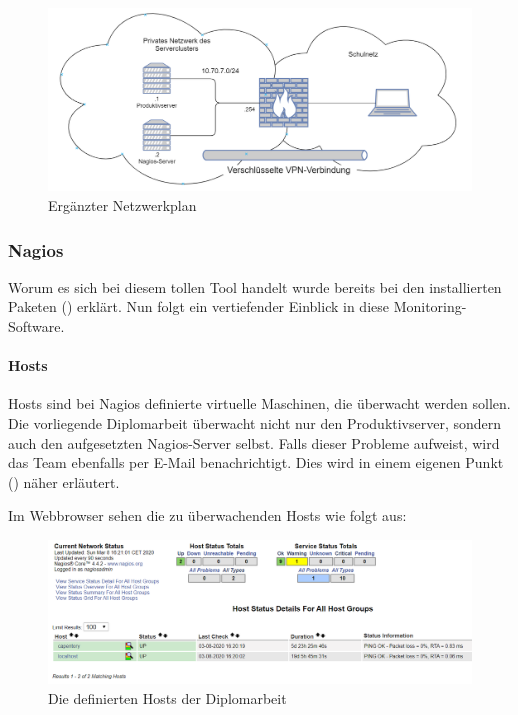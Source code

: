 \documentclass[
]{article}
\begin{document}
\begin{figure}[ht]
\centering
\includegraphics{neutopo.png}
\caption{Ergänzter Netzwerkplan}
\end{figure}

\hypertarget{nagios-1}{%
\subsubsection{Nagios}\label{nagios-1}}

Worum es sich bei diesem tollen Tool handelt wurde bereits bei den
installierten Paketen () erklärt. Nun folgt ein
vertiefender Einblick in diese Monitoring-Software.

\hypertarget{hosts}{%
\paragraph{Hosts}\label{hosts}}

Hosts sind bei Nagios definierte virtuelle Maschinen, die überwacht
werden sollen. Die vorliegende Diplomarbeit überwacht nicht nur den
Produktivserver, sondern auch den aufgesetzten Nagios-Server selbst.
Falls dieser Probleme aufweist, wird das Team ebenfalls per E-Mail
benachrichtigt. Dies wird in einem eigenen Punkt ()
näher erläutert.

Im Webbrowser sehen die zu überwachenden Hosts wie folgt aus:

\begin{figure}[ht]
\centering
\includegraphics{hosts.png}
\caption{Die definierten Hosts der Diplomarbeit}
\end{figure}
\end{document}
